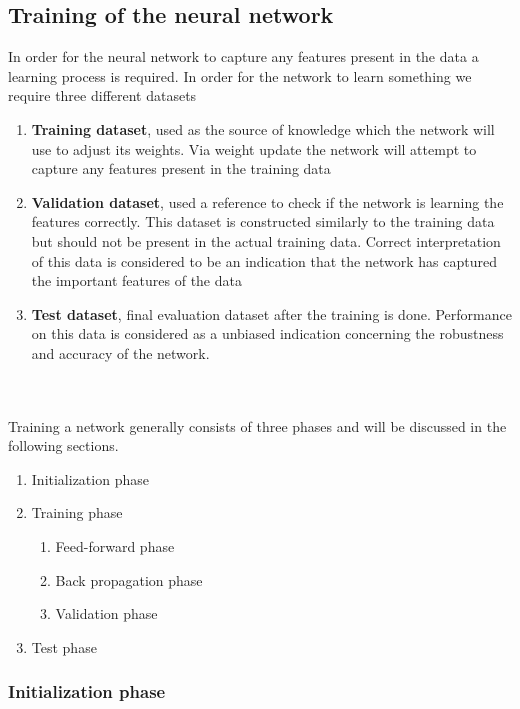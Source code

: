 \documentclass[12pt]{article}
\begin{document}
\subsection{Training of the neural network}

In order for the neural network to capture any features present in the data a learning process is required. In order for the network to learn something we require three different datasets \cite{Bishop2013}\cite{Haykin2008}\cite{Budumu}\cite{P.Murphy1991}\cite{TrevorHastie2009}
\begin{enumerate}
	\item \textbf{Training dataset}, used as the source of knowledge which the network will use to adjust its weights. Via weight update the network will attempt to capture any features present in the training data
	\item \textbf{Validation dataset}, used a reference to check if the network is learning the features correctly. This dataset is constructed similarly to the training data but should not be present in the actual training data. Correct interpretation of this data is considered to be an indication that the network has captured the important features of the data 
	\item \textbf{Test dataset}, final evaluation dataset after the training is done. Performance on this data is considered as a unbiased indication concerning the robustness and accuracy of the network.
\end{enumerate}
\\
\\
Training a network generally consists of three phases and will be discussed in the following sections.
\begin{enumerate}
	\item Initialization phase
	\item Training phase
	\begin{enumerate}
		\item Feed-forward phase
		\item Back propagation phase
		\item Validation phase
	\end{enumerate}
	\item Test phase
\end{enumerate}

\subsubsection{Initialization phase}
\end{document}
